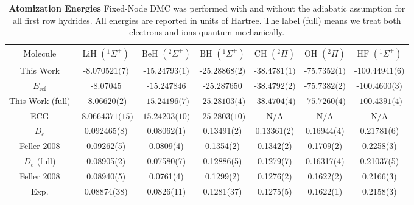 \documentclass[aps,prl,superscriptaddress,groupedaddress]{revtex4}
\begin{document}
\begin{table}[htpb!]
\setlength{\extrarowheight}{3pt}
\begin{tabular}{*{1}{*{7}{c}}}
\hline\hline
$\text{Molecule}$ & $\text{LiH }(^1\Sigma^+)$ & $\text{BeH }(^2\Sigma^+)$ & $\text{BH }(^1\Sigma^+)$ & $\text{CH }(^2\Pi)$ & $\text{OH }(^2\Pi)$ & $\text{HF }(^1\Sigma^+)$ \\ \hline
This Work & $\text{-8.070521(7)}$ & $\text{-15.24793(1)}$ & $\text{-25.28868(2)}$ & $\text{-38.4781(1)}$ & $\text{-75.7352(1)}$ & $\text{-100.44941(6)}$ \\
$E_{\text{ref}}$ \footnotemark[1] \cite{Adamowicz_LiH,Koput_BeH,Miliordos_BH,Davidson_Atoms,Feller_Corrections} & $\text{-8.07045}$ & $\text{-15.247846}$ & $\text{-25.287650}$ & $\text{-38.4792(2)}$ & $\text{-75.7382(2)}$ & $\text{-100.4600(3)}$ \\
This Work (full) & $\text{-8.06620(2)}$ & $\text{-15.24196(7)}$ & $\text{-25.28103(4)}$ & $\text{-38.4704(4)}$ & $\text{-75.7260(4)}$ & $\text{-100.4391(4)}$ \\
ECG \cite{Bubin_LiH_noBO,Bubin_BeH_noBO,Bubin_BH_noBO} & $\text{-8.0664371(15)}$ & $\text{15.24203(10)}$ & $\text{-25.2803(10)}$ & $\text{N/A}$ & $\text{N/A}$ & $\text{N/A}$ \\
\hline
$D_{e}$ & 0.092465(8) & 0.08062(1) & 0.13491(2) & 0.13361(2) & 0.16944(4) & 0.21781(6) \\
Feller 2008\footnotemark[2] \cite{Feller_Corrections} & 0.09262(5) & 0.0809(4) & 0.1354(2) & 0.1342(2) & 0.1709(2) & 0.2258(3) \\
$D_{e}$ (full) & 0.08905(2)  & 0.07580(7)  & 0.12886(5) & 0.1279(7) & 0.16317(4) & 0.21037(5) \\
Feller 2008\footnotemark[3] \cite{Feller_Corrections} & 0.08940(5) & 0.0761(4) & 0.1299(2) & 0.1276(2) & 0.1622(2) & 0.2166(3)\\
Exp. \cite{CCCBDB} & 0.08874(38) & 0.0826(11) & 0.1281(37) & 0.1275(5) & 0.1622(1) & 0.2158(3) \\
\hline\hline
\end{tabular}
\caption{\textbf{Atomization Energies} Fixed-Node DMC was performed with and without the adiabatic assumption for all first row hydrides. All energies are reported in units of Hartree. The label (full) means we treat both electrons and ions quantum mechanically.\label{tab:atomization}}
\end{table} 
\end{document}
